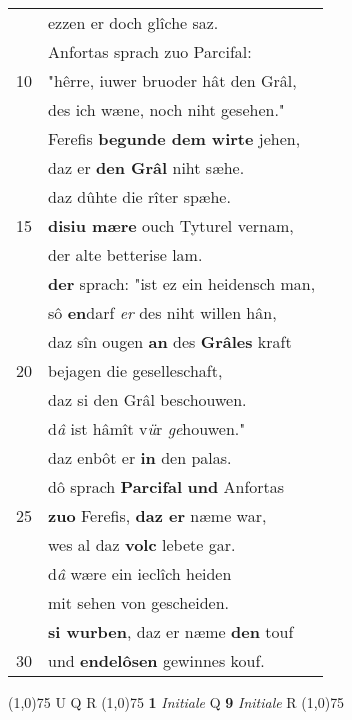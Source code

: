 \documentclass[8pt,a4paper,notitlepage]{article}
\begin{document}
\begin{table}[ht]
\begin{minipage}[t]{0.5\linewidth}
\begin{tabular}{rl}
 & ezzen er doch glîche saz.\\ 
 & Anfortas sprach zuo Parcifal:\\ 
10 & "hêrre, iuwer bruoder hât den Grâl,\\ 
 & des ich wæne, noch niht gesehen."\\ 
 & Ferefis \textbf{begunde dem wirte} jehen,\\ 
 & daz er \textbf{den Grâl} niht sæhe.\\ 
 & daz dûhte die rîter spæhe.\\ 
15 & \textbf{disiu mære} ouch Tyturel vernam,\\ 
 & der alte betterise lam.\\ 
 & \textbf{der} sprach: "ist ez ein heidensch man,\\ 
 & sô \textbf{en}darf \textit{er} des niht willen hân,\\ 
 & daz sîn ougen \textbf{an} des \textbf{Grâles} kraft\\ 
20 & bejagen die geselleschaft,\\ 
 & daz si den Grâl beschouwen.\\ 
 & d\textit{â} ist hâmît v\textit{ü}r \textit{ge}houwen."\\ 
 & daz enbôt er \textbf{in} den palas.\\ 
 & dô sprach \textbf{Parcifal} \textbf{und} Anfortas\\ 
25 & \textbf{zuo} Ferefis, \textbf{daz er} næme war,\\ 
 & wes al daz \textbf{volc} lebete gar.\\ 
 & d\textit{â} wære ein ieclîch heiden\\ 
 & mit sehen von gescheiden.\\ 
 & \textbf{si wurben}, daz er næme \textbf{den} touf\\ 
30 & und \textbf{endelôsen} gewinnes kouf.\\ 
\end{tabular}
\scriptsize
\line(1,0){75} \newline
U Q R \newline
\line(1,0){75} \newline
\textbf{1} \textit{Initiale} Q  \textbf{9} \textit{Initiale} R  \newline
\line(1,0){75} \newline

\end{minipage}
\end{table}
\end{document}
